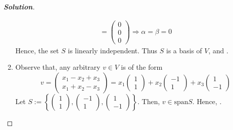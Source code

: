 \documentclass[10pt]{scrartcl}
\theoremstyle{definition}
\newenvironment{solution} {\begin{proof}[\normalfont \textbf{Solution}]} {\end{proof}}
\begin{document}
\begin{solution}
\begin{enumerate}[label={(\roman*)}]
\begin{gather*}
                =
                \begin{pmatrix}
                    0 \\ 
                    0 \\ 
                    0
                \end{pmatrix}
                \Rightarrow
                \alpha = \beta = 0
            \end{gather*}
            Hence, the set $S$ is linearly independent. Thus $S$ is a basis of $V$,
            and .
        \item Observe that, any arbitrary $v \in V$ is of the form 
            $$v = 
            \begin{pmatrix}
                x_1 - x_2 + x_3 \\ 
                x_1 + x_2 - x_3
            \end{pmatrix}
            =x_1
            \begin{pmatrix}
                1 \\ 
                1 
            \end{pmatrix}
            +x_2
            \begin{pmatrix}
                -1 \\ 
                1
            \end{pmatrix}
            +x_3
            \begin{pmatrix}
                1 \\ 
                -1
            \end{pmatrix}
            $$
            Let $S := 
            \left\{
            \begin{pmatrix}
                1 \\ 
                1 
            \end{pmatrix}
            ,
            \begin{pmatrix}
                -1 \\ 
                1
            \end{pmatrix}
            ,
            \begin{pmatrix}
                1 \\ 
                -1
            \end{pmatrix}
        \right\}
        $. 
        Then, $v \in \text{span}S$. Hence, .


\end{enumerate}
\end{solution}
\end{document}
